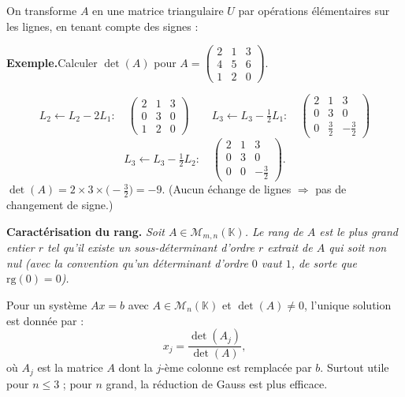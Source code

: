 On transforme $A$ en une matrice triangulaire $U$ par opérations élémentaires
sur les lignes, en tenant compte des signes :

\begin{mdframed}[style=exbar]
  \textbf{Exemple.}\enspace{}Calculer $\det(A)$ pour
  $A = \begin{pmatrix}2&1&3\\4&5&6\\1&2&0\end{pmatrix}$.

  \[
    L_2 \leftarrow L_2 - 2L_1 :\quad
    \begin{pmatrix}2&1&3\\0&3&0\\1&2&0\end{pmatrix}
    \qquad
    L_3 \leftarrow L_3 - \tfrac{1}{2}L_1 :\quad
    \begin{pmatrix}2&1&3\\0&3&0\\0&\tfrac{3}{2}&-\tfrac{3}{2}\end{pmatrix}
  \]
  \[
    L_3 \leftarrow L_3 - \tfrac{1}{2}L_2 :\quad
    \begin{pmatrix}2&1&3\\0&3&0\\0&0&-\tfrac{3}{2}\end{pmatrix}.
  \]
  $\det(A) = 2 \times 3 \times \bigl(-\tfrac{3}{2}\bigr) = -9$.
  (Aucun échange de lignes $\Rightarrow$ pas de changement de signe.)
\end{mdframed}

\decsep{}


\begin{tcolorbox}[thmbox]
  \textbf{Caractérisation du rang.}\enspace%
  \textit{Soit $A \in \mathcal{M}_{m,n}(\mathbb{K})$. Le rang de $A$ est
  le plus grand entier $r$ tel qu'il existe un sous-déterminant
  d'ordre $r$ extrait de $A$ qui soit non nul
  (avec la convention qu'un déterminant d'ordre $0$ vaut $1$,
  de sorte que $\mathrm{rg}(0) = 0$).}
\end{tcolorbox}

Pour un système $Ax = b$ avec $A \in \mathcal{M}_n(\mathbb{K})$ et $\det(A)\neq 0$,
l'unique solution est donnée par :
\[
  x_j = \frac{\det(A_j)}{\det(A)},
\]
où $A_j$ est la matrice $A$ dont la $j$-ème colonne est remplacée par $b$.
Surtout utile pour $n\leq 3$ ; pour $n$ grand, la réduction de Gauss est plus efficace.


